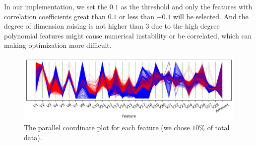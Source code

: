 \documentclass[11pt]{article}
\begin{document}
In our implementation, we set the $0.1$ as the threshold and only the features with correlation coefficients great than $0.1$ or less than $-0.1$ will be selected. And the degree of dimension raising is not higher than $3$ due to the high degree polynomial features might cause numerical instability or be correlated, which can making optimization more difficult.

\begin{figure}[H]
  \centering
  \includegraphics[width=\textwidth]{../code/Task3/Analysis/PC.jpg}
  \caption{The parallel coordinate plot for each feature (we chose $10\%$ of total data).}
  \label{task-3-data-distribution}
\end{figure}
\end{document}
